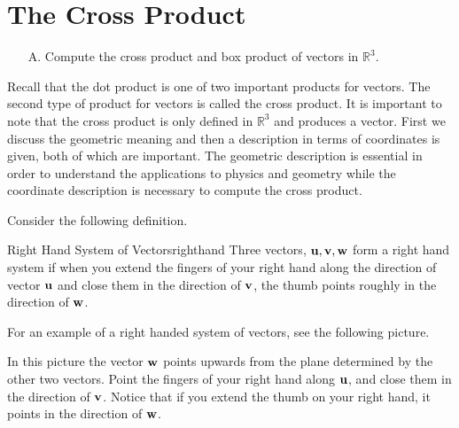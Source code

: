 \section{The Cross Product}

\begin{outcome}

\begin{enumerate}

\item[A.] Compute the cross product and box product of vectors in $\mathbb{R}^3$.
\end{enumerate}
\end{outcome}

Recall that the dot product is one of two important products for vectors. The second type of product for vectors is called the cross product. It is important to note that the 
cross product is only defined in $\mathbb{R}^{3}$ and produces a vector. 
First we discuss the geometric meaning and then a description in terms of
coordinates is given, both of which are important. 
The geometric description is essential in order to understand the
applications to physics and geometry while the coordinate description is necessary to compute the cross product.

Consider the following definition.

\begin{definition}{Right Hand System of Vectors}{righthand}
Three vectors, ${\bf u},{\bf v},{\bf w}$ form a right hand system if when you
extend the fingers of your right hand along the direction of vector ${\bf u}$ and
close them in the direction of ${\bf v}$, the thumb points roughly in the
direction of ${\bf w}$.
\end{definition}

For an example of a right handed system of vectors, see the following
picture.

\begin{center}
\end{center}

In this picture the vector ${\bf w}$ points upwards from the plane
determined by the other two vectors. Point the fingers of your right hand along ${\bf u}$, and 
close them in the direction of ${\bf v}$. Notice that if you extend the thumb on your right hand,
it points in the direction of ${\bf w}$.

